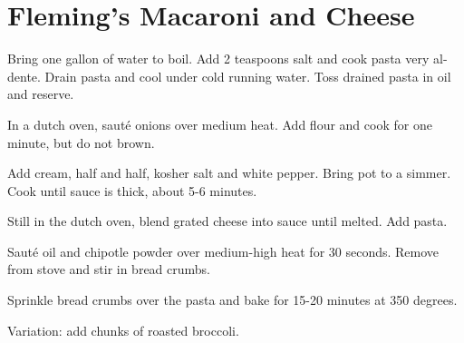 
\section{Fleming's Macaroni and Cheese}
\begin{recipe}



Bring one gallon of water to boil. Add 2 teaspoons salt and cook pasta very al-dente. Drain pasta and cool under cold running water. Toss drained pasta in oil and reserve.


In a dutch oven, sauté onions over medium heat. Add flour and cook for one minute, but do not brown.


Add cream, half and half, kosher salt and white pepper. Bring pot to a simmer. Cook until sauce is thick, about 5-6 minutes.


Still in the dutch oven, blend grated cheese into sauce until melted. Add pasta.


Sauté oil and chipotle powder over medium-high heat for 30 seconds. Remove from stove and stir in bread crumbs.

Sprinkle bread crumbs over the pasta and bake for 15-20 minutes at 350 degrees.

Variation: add chunks of roasted broccoli.

\end{recipe}


